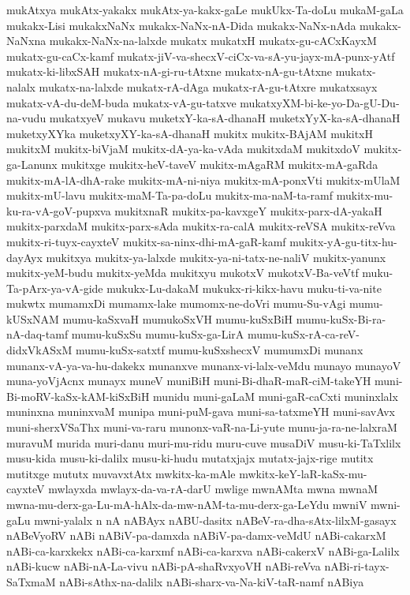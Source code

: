 {mukAtxya
mukAtx-yakakx
mukAtx-ya-kakx-gaLe
mukUkx-Ta-doLu
mukaM-gaLa
mukakx-Lisi
mukakxNaNx
mukakx-NaNx-nA-Dida
mukakx-NaNx-nAda
mukakx-NaNxna
mukakx-NaNx-na-lalxde
mukatx
mukatxH
mukatx-gu-cACxKayxM
mukatx-gu-caCx-kamf
mukatx-jiV-va-shecxV-ciCx-va-sA-yu-jayx-mA-punx-yAtf
mukatx-ki-libxSAH
mukatx-nA-gi-ru-tAtxne
mukatx-nA-gu-tAtxne
mukatx-nalalx
mukatx-na-lalxde
mukatx-rA-dAga
mukatx-rA-gu-tAtxre
mukatxsayx
mukatx-vA-du-deM-buda
mukatx-vA-gu-tatxve
mukatxyXM-bi-ke-yo-Da-gU-Du-na-vudu
mukatxyeV
mukavu
muketxY-ka-sA-dhanaH
muketxYyX-ka-sA-dhanaH
muketxyXYka
muketxyXY-ka-sA-dhanaH
mukitx
mukitx-BAjAM
mukitxH
mukitxM
mukitx-biVjaM
mukitx-dA-ya-ka-vAda
mukitxdaM
mukitxdoV
mukitx-ga-Lanunx
mukitxge
mukitx-heV-taveV
mukitx-mAgaRM
mukitx-mA-gaRda
mukitx-mA-lA-dhA-rake
mukitx-mA-ni-niya
mukitx-mA-ponxVti
mukitx-mUlaM
mukitx-mU-lavu
mukitx-maM-Ta-pa-doLu
mukitx-ma-naM-ta-ramf
mukitx-mu-ku-ra-vA-goV-pupxva
mukitxnaR
mukitx-pa-kavxgeY
mukitx-parx-dA-yakaH
mukitx-parxdaM
mukitx-parx-sAda
mukitx-ra-calA
mukitx-reVSA
mukitx-reVva
mukitx-ri-tuyx-cayxteV
mukitx-sa-ninx-dhi-mA-gaR-kamf
mukitx-yA-gu-titx-hu-dayAyx
mukitxya
mukitx-ya-lalxde
mukitx-ya-ni-tatx-ne-naliV
mukitx-yanunx
mukitx-yeM-budu
mukitx-yeMda
mukitxyu
mukotxV
mukotxV-Ba-veVtf
muku-Ta-pArx-ya-vA-gide
mukukx-Lu-dakaM
mukukx-ri-kikx-havu
muku-ti-va-nite
mukwtx
mumamxDi
mumamx-lake
mumomx-ne-doVri
mumu-Su-vAgi
mumu-kUSxNAM
mumu-kaSxvaH
mumukoSxVH
mumu-kuSxBiH
mumu-kuSx-Bi-ra-nA-daq-tamf
mumu-kuSxSu
mumu-kuSx-ga-LirA
mumu-kuSx-rA-ca-reV-didxVkASxM
mumu-kuSx-satxtf
mumu-kuSxshecxV
mumumxDi
munanx
munanx-vA-ya-va-hu-dakekx
munanxve
munanx-vi-lalx-veMdu
munayo
munayoV
muna-yoVjAcnx
munayx
muneV
muniBiH
muni-Bi-dhaR-maR-ciM-takeYH
muni-Bi-moRV-kaSx-kAM-kiSxBiH
munidu
muni-gaLaM
muni-gaR-caCxti
muninxlalx
muninxna
muninxvaM
munipa
muni-puM-gava
muni-sa-tatxmeYH
muni-savAvx
muni-sherxVSaThx
muni-va-raru
munonx-vaR-na-Li-yute
munu-ja-ra-ne-lalxraM
muravuM
murida
muri-danu
muri-mu-ridu
muru-cuve
musaDiV
musu-ki-TaTxlilx
musu-kida
musu-ki-dalilx
musu-ki-hudu
mutatxjajx
mutatx-jajx-rige
mutitx
mutitxge
mututx
muvavxtAtx
mwkitx-ka-mAle
mwkitx-keY-laR-kaSx-mu-cayxteV
mwlayxda
mwlayx-da-va-rA-darU
mwlige
mwnAMta
mwna
mwnaM
mwna-mu-derx-ga-Lu-mA-hAlx-da-mw-nAM-ta-mu-derx-ga-LeYdu
mwniV
mwni-gaLu
mwni-yalalx
n
nA
nABAyx
nABU-dasitx
nABeV-ra-dha-sAtx-lilxM-gasayx
nABeVyoRV
nABi
nABiV-pa-damxda
nABiV-pa-damx-veMdU
nABi-cakarxM
nABi-ca-karxkekx
nABi-ca-karxmf
nABi-ca-karxva
nABi-cakerxV
nABi-ga-Lalilx
nABi-kucw
nABi-nA-La-vivu
nABi-pA-shaRvxyoVH
nABi-reVva
nABi-ri-tayx-SaTxmaM
nABi-sAthx-na-dalilx
nABi-sharx-va-Na-kiV-taR-namf
nABiya
}

